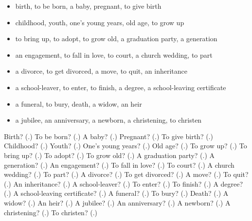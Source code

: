 \begin{itemize}
\raggedright
  \item birth, to be born, a baby, pregnant, to give birth
  \item childhood, youth, one's young years, old age, to grow up
  \item to bring up, to adopt, to grow old, a graduation party, a generation
  \item an engagement, to fall in love, to court, a church wedding, to part
  \item a divorce, to get divorced, a move, to quit, an inheritance
  \item a school-leaver, to enter, to finish, a degree, a school-leaving certificate
  \item a funeral, to bury, death, a widow, an heir
  \item a jubilee, an anniversary, a newborn, a christening, to christen
\end{itemize}

\begin{tcolorbox}[breakable,colback=teal!4,colframe=teal!35!black,title={Before you move on}]
Birth? (\textbf{}.) To be born? (\textbf{}.) A baby? (\textbf{}.) Pregnant? (\textbf{}.) To give birth? (\textbf{}.) Childhood? (\textbf{}.) Youth? (\textbf{}.) One's young years? (\textbf{}.) Old age? (\textbf{}.) To grow up? (\textbf{}.) To bring up? (\textbf{}.) To adopt? (\textbf{}.) To grow old? (\textbf{}.) A graduation party? (\textbf{}.) A generation? (\textbf{}.) An engagement? (\textbf{}.) To fall in love? (\textbf{}.) To court? (\textbf{}.) A church wedding? (\textbf{}.) To part? (\textbf{}.) A divorce? (\textbf{}.) To get divorced? (\textbf{}.) A move? (\textbf{}.) To quit? (\textbf{}.) An inheritance? (\textbf{}.) A school-leaver? (\textbf{}.) To enter? (\textbf{}.) To finish? (\textbf{}.) A degree? (\textbf{}.) A school-leaving certificate? (\textbf{}.) A funeral? (\textbf{}.) To bury? (\textbf{}.) Death? (\textbf{}.) A widow? (\textbf{}.) An heir? (\textbf{}.) A jubilee? (\textbf{}.) An anniversary? (\textbf{}.) A newborn? (\textbf{}.) A christening? (\textbf{}.) To christen? (\textbf{}.)
\end{tcolorbox}
